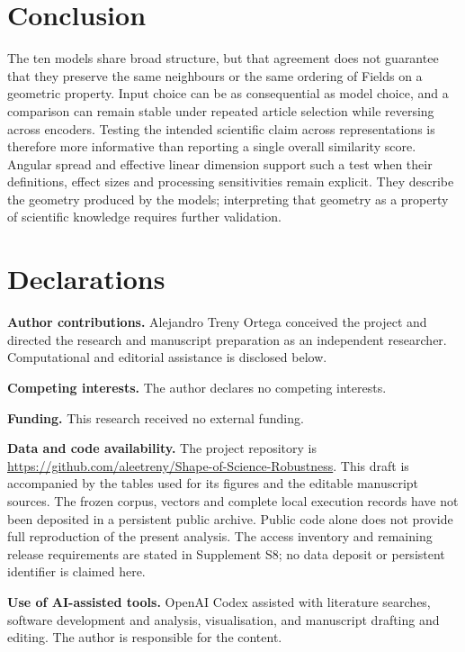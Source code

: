 \documentclass[12pt]{article}
\begin{document}
\section{Conclusion}
The ten models share broad structure, but that agreement does not guarantee that they preserve the same neighbours or the same ordering of Fields on a geometric property. Input choice can be as consequential as model choice, and a comparison can remain stable under repeated article selection while reversing across encoders. Testing the intended scientific claim across representations is therefore more informative than reporting a single overall similarity score. Angular spread and effective linear dimension support such a test when their definitions, effect sizes and processing sensitivities remain explicit. They describe the geometry produced by the models; interpreting that geometry as a property of scientific knowledge requires further validation.

\section*{Declarations}
\textbf{Author contributions.}
Alejandro Treny Ortega conceived the project and directed the research and manuscript preparation as an independent researcher. Computational and editorial assistance is disclosed below.
\par\medskip
\textbf{Competing interests.}
The author declares no competing interests.
\par\medskip
\textbf{Funding.}
This research received no external funding.
\par\medskip
\textbf{Data and code availability.}
The project repository is \url{https://github.com/aleetreny/Shape-of-Science-Robustness}. This draft is accompanied by the tables used for its figures and the editable manuscript sources. The frozen corpus, vectors and complete local execution records have not been deposited in a persistent public archive. Public code alone does not provide full reproduction of the present analysis. The access inventory and remaining release requirements are stated in Supplement S8; no data deposit or persistent identifier is claimed here.
\par\medskip
\textbf{Use of AI-assisted tools.}
OpenAI Codex assisted with literature searches, software development and analysis, visualisation, and manuscript drafting and editing. The author is responsible for the content.



\end{document}
